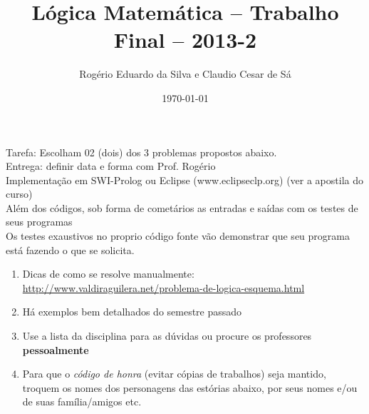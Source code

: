 \documentclass[a4paper,12pt]{article}
\title{Lógica Matemática -- Trabalho Final -- 2013-2}
\author{Rogério Eduardo da Silva e Claudio Cesar de Sá}
\date{\today}
\begin{document}
\maketitle

\begin{flushleft}

 Tarefa: Escolham 02 (dois) dos 3 problemas propostos abaixo.\\
Entrega: definir data e forma com Prof. Rogério \\ 

 Implementação em SWI-Prolog ou Eclipse (www.eclipseclp.org) (ver a apostila do curso)\\

 Além dos códigos, sob forma de cometários as entradas e saídas com os testes de seus programas\\

 Os testes exaustivos no proprio código fonte vão demonstrar que seu programa está fazendo o que se solicita.

\end{flushleft}

\begin{enumerate}

\item Dicas de como se resolve manualmente:\\
\url{http://www.valdiraguilera.net/problema-de-logica-esquema.html}

\item Há exemplos bem detalhados do semestre passado\\

\item Use a lista da disciplina para as dúvidas ou procure
os professores \textbf{pessoalmente}\\

\item Para que o \textit{código de honra} (evitar cópias de trabalhos) seja mantido,
troquem os nomes dos personagens das estórias abaixo, por seus nomes e/ou de suas família/amigos etc. 

\end{enumerate}


\end{document}
